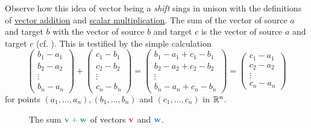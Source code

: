 Observe how this idea of vector being a \emph{shift} sings in unison with the
definitions of \hyperref[def:adding-vectors]{vector addition} and
\hyperref[def:multiplying-vector-by-a-number]{scalar multiplication}. The sum of
the vector of source $a$ and target $b$ with the vector of source $b$ and target
$c$ is the vector of source $a$ and target $c$ (cf.
). This is testified by the simple
calculation
\[
 \begin{pmatrix}
  b_1 - a_1\\
  b_2 - a_2\\
  \vdots\\
  b_n - a_n
 \end{pmatrix}
 + 
 \begin{pmatrix}
  c_1 - b_1\\
  c_2 - b_2\\
  \vdots\\
  c_n - b_n
 \end{pmatrix}
 =
 \begin{pmatrix}
  b_1 - a_1 + c_1 - b_1\\
  b_2 - a_2 + c_2 - b_2\\
  \vdots\\
  b_n - a_n + c_n - b_n
 \end{pmatrix}
 = 
 \begin{pmatrix}
  c_1 - a_1\\
  c_2 - a_2\\
  \vdots\\
  c_n - a_n
 \end{pmatrix}
\]
for points $(a_1,\ldots,a_n), (b_1,\ldots,b_n)$ and $(c_1,\ldots,c_n)$ in
$\mathbb{R}^{n}$.

\begin{figure}[ht]
 \centering
 \caption{The sum $\clg{\mathbf{v} + \mathbf{w}}$ of vectors $\clr{\mathbf{v}}$
 and $\clb{\mathbf{w}}$.}
 \label{fig:vector-addition}
\end{figure}

